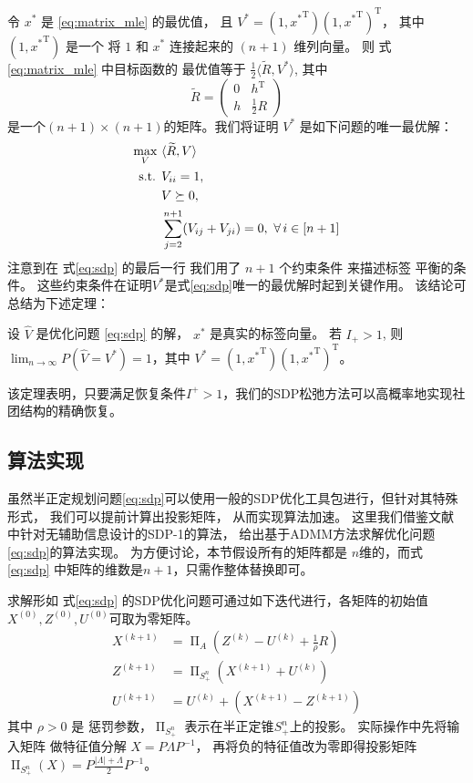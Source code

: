 令 $x^*$ 是 \eqref{eq:matrix_mle} 的最优值，
且 $V^*=(1,{x^*}^{\mathrm{T}})
(1,{x^*}^{\mathrm{T}})^{\mathrm{T}}
$， 
其中 $(1,{x^*}^{\mathrm{T}})$ 是一个
将 $1$ 和 $x^*$ 连接起来的
$(n+1)$ 维列向量。
	则 式\eqref{eq:matrix_mle} 中目标函数的
    最优值等于 $\frac{1}{2} \langle \widetilde{R}, V^* \rangle$, 其中
	\begin{equation}\label{eq:B_lambda_def}
		\widetilde{R} = \begin{pmatrix} 0 & h^{\mathrm{T}}  \\ h  & \frac{1}{2}R \end{pmatrix} 
	\end{equation}
	是一个$(n+1)\times(n+1)$的矩阵。我们将证明 $V^*$ 是如下问题的唯一最优解：
	\begin{align}
		\max_V\ & \langle \widetilde{R}, V \rangle  \notag\\
		\textrm{ s.t. }  &V_{ii} = 1, \notag\\
		&V \succeq 0, \notag\\
        &\sum_{j=2}^{n+1} (V_{ij} + V_{ji}) = 0,~\forall\, i\in [n+1]
\label{eq:sdp}
	\end{align}
	注意到在 式\eqref{eq:sdp} 的最后一行
    我们用了 $n+1$ 个约束条件 来描述标签 平衡的条件。
    这些约束条件在证明$V^*$是式\eqref{eq:sdp}唯一的最优解时起到关键作用。
    该结论可总结为下述定理：

	\begin{theorem}\label{thm:sdp}
        设 $\hat{V}$ 是优化问题 \eqref{eq:sdp} 的解，
        $x^*$ 是真实的标签向量。
		若 $I_+ > 1$, 则
        $\lim_{n\to\infty} P(\hat{V}=V^*)=1$，其中
		$V^*=(1,{x^*}^{\mathrm{T}})
        (1,{x^*}^{\mathrm{T}})^{\mathrm{T}}$。
	\end{theorem}
    该定理表明，只要满足恢复条件$I^+>1$，我们的SDP松弛方法可以高概率地实现社团结构的精确恢复。


\subsection{算法实现}\label{sec:sdp_admm}
虽然半正定规划问题\eqref{eq:sdp}可以使用一般的SDP优化工具包进行，但针对其特殊形式，
我们可以提前计算出投影矩阵，
从而实现算法加速。
这里我们借鉴文献  中针对无辅助信息设计的SDP-1的算法，
给出基于ADMM方法求解优化问题\eqref{eq:sdp}的算法实现。
为方便讨论，本节假设所有的矩阵都是 $n$维的，而式 \eqref{eq:sdp} 中矩阵的维数是$n+1$，只需作整体替换即可。

求解形如 式\eqref{eq:sdp} 的SDP优化问题可通过如下迭代进行，各矩阵的初始值$X^{(0)},Z^{(0)},U^{(0)}$可取为零矩阵。
\begin{align}
    X^{(k+1)} &= \upPi_A\left(Z^{(k)} - U^{(k)} + \frac{1}{\rho}R \right)\label{eq:admm} \\
    Z^{(k+1)} &= \upPi_{S_+^n}(X^{(k+1)} + U^{(k)}) \\
    U^{(k+1)} &= U^{(k)} + (X^{(k+1)} - Z^{(k+1)}) 
    \end{align}
其中 $\rho>0$ 是 惩罚参数，$\upPi_{S_+^n}$ 表示在半正定锥$S_+^n$上的投影。
实际操作中先将输入矩阵 做特征值分解 $X=P\Lambda P^{-1}$，
再将负的特征值改为零即得投影矩阵$\upPi_{S_+^n}(X)=P\frac{|\Lambda| + \Lambda}{2}P^{-1}$。

